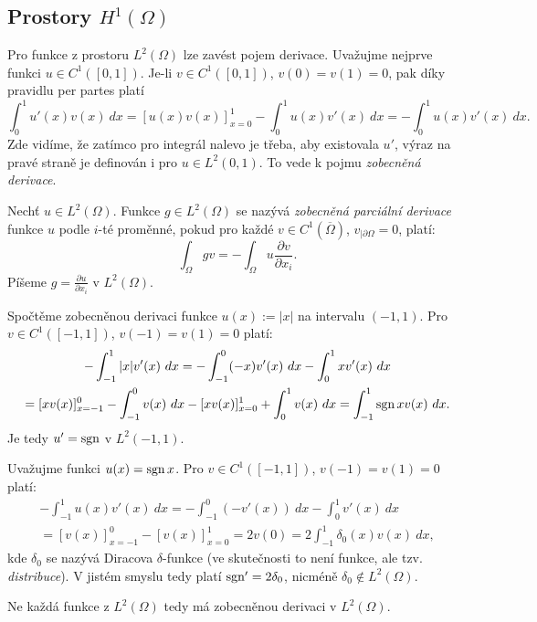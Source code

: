 \subsection{Prostory $H^1(\Omega)$}

Pro funkce z prostoru $L^2(\Omega)$ lze zavést pojem derivace.
Uvažujme nejprve funkci $u\in C^1([0,1])$.
Je-li $v\in C^1([0,1])$, $v(0)=v(1)=0$, pak díky pravidlu per partes platí
\[ \int_0^1 u'(x)v(x)~dx = [u(x)v(x)]_{x=0}^1 - \int_0^1u(x)v'(x)~dx = - \int_0^1u(x)v'(x)~dx. \]
Zde vidíme, že zatímco pro integrál nalevo je třeba, aby existovala $u'$, výraz na pravé straně je definován i pro $u\in L^2(0,1)$. To vede k pojmu \emph{zobecněná derivace}.
\begin{df}
Nechť $u\in L^2(\Omega)$. Funkce $g\in L^2(\Omega)$ se nazývá \emph{zobecněná parciální derivace} funkce $u$ podle $i$-té proměnné, pokud pro každé $v\in C^1(\overline\Omega)$, $v_{|\partial\Omega}=0$, platí:
\[ \int_\Omega gv = -\int_{\Omega} u\frac{\partial v}{\partial x_i}. \]
Píšeme $g=\frac{\partial u}{\partial x_i}$ v $L^2(\Omega)$.
\end{df}
\begin{ex}
Spočtěme zobecněnou derivaci funkce $u(x):=|x|$ na intervalu $(-1,1)$.
Pro $v\in C^1([-1,1])$, $v(-1)=v(1)=0$ platí:
\begin{multline*}
-\int_{-1}^1|x|v'(x)~dx = -\int_{-1}^0(-x)v'(x)~dx - \int_0^1xv'(x)~dx\\
= [xv(x)]_{x=-1}^0 - \int_{-1}^0v(x)~dx - [xv(x)]_{x=0}^1 + \int_0^1v(x)~dx
= \int_{-1}^1\operatorname{sgn} x v(x)~dx.
\end{multline*}
Je tedy $u'=\operatorname{sgn}$ v $L^2(-1,1)$.
\end{ex}
\begin{ex}
Uvažujme funkci $u(x) = \operatorname{sgn} x$. Pro $v\in C^1([-1,1])$, $v(-1)=v(1)=0$ platí:
\begin{multline*}
 -\int_{-1}^1u(x)v'(x)~dx = -\int_{-1}^0 (-v'(x))~dx - \int_0^1 v'(x)~dx\\
 = [v(x)]_{x=-1}^0 - [v(x)]_{x=0}^1 = 2v(0) = 2\int_{-1}^1\delta_0(x)v(x)~dx,
\end{multline*}
kde $\delta_0$ se nazývá Diracova $\delta$-funkce (ve skutečnosti to není funkce, ale tzv. \emph{distribuce}). V jistém smyslu tedy platí $\operatorname{sgn}'=2\delta_0$, nicméně $\delta_0\notin L^2(\Omega)$.
\end{ex}
Ne každá funkce z $L^2(\Omega)$ tedy má zobecněnou derivaci v $L^2(\Omega)$.

